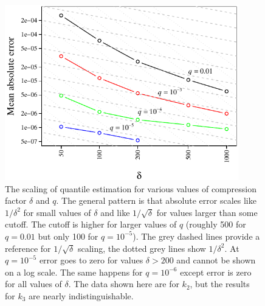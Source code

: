 \documentclass[]{statsoc}
\begin{document}
\begin{figure}[p] %
   \centering
   \includegraphics[width=4in]{figures/error-vs-compression.pdf} 
   \caption{The scaling of quantile estimation for various values of compression factor $\delta$ and $q$. 
   The general pattern is that absolute error scales like $1/\delta^2$ for small values of $\delta$ and like $1/\sqrt{\delta}$ for values larger than some cutoff. The cutoff is higher for larger values of $q$ (roughly 500 for $q=0.01$ but only 100 for $q=10^{-5}$). The grey dashed lines provide a reference for $1/\sqrt{\delta}$ scaling, the dotted grey lines show $1/\delta^2$.   At $q=10^{-5}$ error goes to zero for values $\delta > 200$ and cannot be shown on a log scale. The same happens for $q=10^{-6}$ except error is zero for all values of $\delta$. The data shown here are for $k_2$, but the results for $k_3$ are nearly indistinguishable.}
   \label{fig:accuracy-scaling}
\end{figure}
\end{document}
